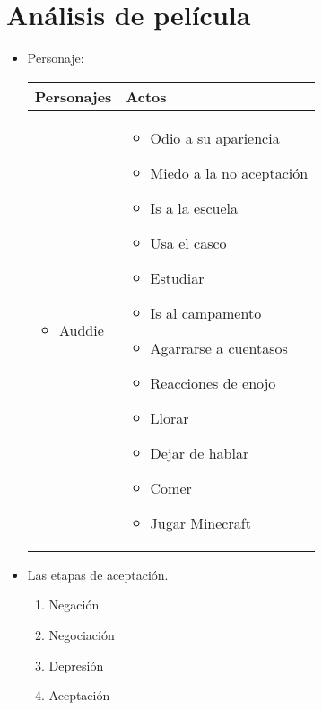 \section{Análisis de película}
\begin{itemize}
    \item Personaje:
        \begin{center}
           \begin{tabular}{ | p{5cm} | p{5cm} | }
               \hline
                    Personajes & Actos   \\
               \hline
                    \begin{itemize}
                        \item Auddie 
                    \end{itemize}
                    & 
                    \begin{itemize}
                        \item Odio a su apariencia 
                        \item Miedo a la no aceptación 
                        \item Is a la escuela 
                        \item Usa el casco 
                        \item Estudiar 
                        \item Is al campamento 
                        \item Agarrarse a cuentasos 
                        \item Reacciones de enojo 
                        \item Llorar 
                        \item Dejar de hablar 
                        \item Comer 
                        \item Jugar Minecraft 
                    \end{itemize}
               \hline
           \end{tabular}
        \end{center}
    
    \item Las etapas de aceptación.
        \begin{enumerate}
            \item Negación 
            \item Negociación 
            \item Depresión 
            \item Aceptación 
        \end{enumerate}
    

\end{itemize}
